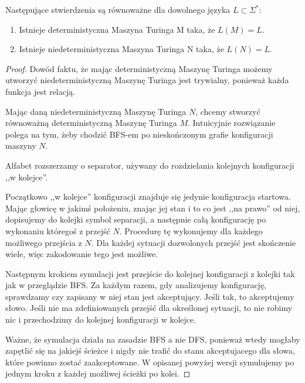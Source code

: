 \begin{theorem}
    Następujące stwierdzenia są równoważne dla dowolnego języka \( L \subset \Sigma^*\):
    \begin{enumerate}
        \item Istnieje deterministyczna Maszyna Turinga M taka, że \(L(M) = L\).
        \item Istnieje niedeterministyczna Maszyna Turinga N taka, że \(L(N) = L \). 
    \end{enumerate}
\end{theorem}

\begin{proof}
    Dowód faktu, że mając deterministyczną Maszynę Turinga możemy utworzyć niedeterministyczną Maszynę Turinga jest trywialny, ponieważ każda funkcja jest relacją. 
    
    Mając daną niedeterministyczną Maszynę Turinga \(N\), chcemy stworzyć równoważną deterministyczną Maszynę Turinga \(M\). Intuicyjnie rozwiązanie polega na tym, żeby chodzić BFS-em po nieskończonym grafie konfiguracji maszyny \(N\).
    
    Alfabet rozszerzamy o separator, używany do rozdzielania kolejnych konfiguracji ,,w kolejce''. 
    
    Początkowo ,,w kolejce'' konfiguracji znajduje się jedynie konfiguracja startowa. Mając głowicę w jakimś położeniu, znając jej stan i to co jest ,,na prawo'' od niej, dopisujemy do kolejki symbol separacji, a następnie całą konfigurację po wykonaniu któregoś z przejść \(N\). Procedurę tę wykonujemy dla każdego możliwego przejścia z \(N\). 
    Dla każdej sytuacji dozwolonych przejść jest skończenie wiele, więc zakodowanie tego jest możliwe.
    
    Następnym krokiem symulacji jest przejście do kolejnej konfiguracji z kolejki tak jak w przeglądzie BFS.
    Za każdym razem, gdy analizujemy konfigurację, sprawdzamy czy zapisany w niej stan jest akceptujący. Jeśli tak, to akceptujemy słowo. Jeśli nie ma zdefiniowanych przejść dla określonej sytuacji, to nie robimy nic i przechodzimy do kolejnej konfiguracji w kolejce.
    
    Ważne, że symulacja działa na zasadzie BFS a nie DFS, ponieważ wtedy mogłaby zapętlić się na jakiejś ścieżce i nigdy nie trafić do stanu akceptujacego dla słowa, które powinno zostać zaakceptowane.
    W opisanej powyżej wersji symulujemy po jednym kroku z każdej możliwej ścieżki po kolei.
\end{proof}
